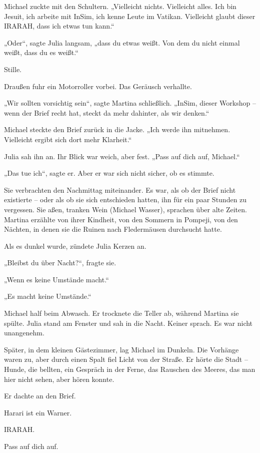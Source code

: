 \documentclass[
]{article}
\begin{document}
Michael zuckte mit den Schultern. „Vielleicht nichts. Vielleicht alles. Ich bin Jesuit, ich arbeite mit InSim, ich kenne Leute im Vatikan. Vielleicht glaubt dieser IRARAH, dass ich etwas tun kann.``

„Oder``, sagte Julia langsam, „dass du etwas weißt. Von dem du nicht einmal weißt, dass du es weißt.``

Stille.

Draußen fuhr ein Motorroller vorbei. Das Geräusch verhallte.

„Wir sollten vorsichtig sein``, sagte Martina schließlich. „InSim, dieser Workshop -- wenn der Brief recht hat, steckt da mehr dahinter, als wir denken.``

Michael steckte den Brief zurück in die Jacke. „Ich werde ihn mitnehmen. Vielleicht ergibt sich dort mehr Klarheit.``

Julia sah ihn an. Ihr Blick war weich, aber fest. „Pass auf dich auf, Michael.``

„Das tue ich``, sagte er. Aber er war sich nicht sicher, ob es stimmte.

Sie verbrachten den Nachmittag miteinander. Es war, als ob der Brief nicht existierte -- oder als ob sie sich entschieden hatten, ihn für ein paar Stunden zu vergessen. Sie aßen, tranken Wein (Michael Wasser), sprachen über alte Zeiten. Martina erzählte von ihrer Kindheit, von den Sommern in Pompeji, von den Nächten, in denen sie die Ruinen nach Fledermäusen durchsucht hatte.

Als es dunkel wurde, zündete Julia Kerzen an.

„Bleibst du über Nacht?{\kern0pt}``, fragte sie.

„Wenn es keine Umstände macht.``

„Es macht keine Umstände.``

Michael half beim Abwasch. Er trocknete die Teller ab, während Martina sie spülte. Julia stand am Fenster und sah in die Nacht. Keiner sprach. Es war nicht unangenehm.

Später, in dem kleinen Gästezimmer, lag Michael im Dunkeln. Die Vorhänge waren zu, aber durch einen Spalt fiel Licht von der Straße. Er hörte die Stadt -- Hunde, die bellten, ein Gespräch in der Ferne, das Rauschen des Meeres, das man hier nicht sehen, aber hören konnte.

Er dachte an den Brief.

Harari ist ein Warner.

IRARAH.

Pass auf dich auf.
\end{document}
